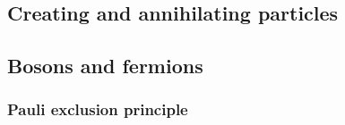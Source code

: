         \subsection{Creating and annihilating particles}

        \subsection{Bosons and fermions}

            \subsubsection{Pauli exclusion principle}

